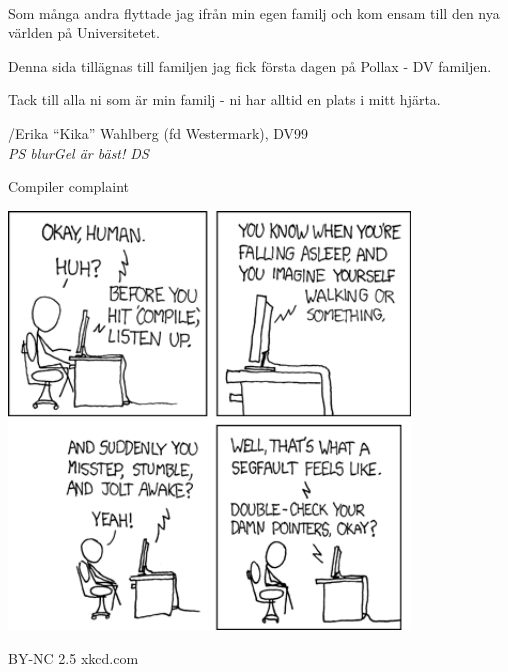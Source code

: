 \documentclass[a6paper,fontsize=10pt,twoside,open=right]{scrbook}
\begin{document}
\vspace{10pt}\\ Som många andra flyttade jag ifrån min egen familj och
kom ensam till den nya världen på Universitetet.\par
\vspace{10pt}
Denna sida tillägnas till familjen jag fick första dagen på Pollax -
DV familjen.\par
\vspace{10pt}
Tack till alla ni som är min familj - ni har alltid en plats i mitt
hjärta.\par
\vspace{10pt}
/Erika ``Kika'' Wahlberg (fd Westermark),
DV99\\{\footnotesize\textit{PS blurGel är bäst! DS}}
\newpage

\vspace{15pt}

\newpage

\newpage

\newpage

\vspace{15pt}

\newpage

\vspace{15pt}

\newpage
\null
\vfill
{}
\begin{center}
  \tiny{Compiler complaint}\par
  \vspace{5pt}
  \includegraphics[keepaspectratio,width=0.8\textwidth]{elements/images/compiler_complaint_1.png}\par
  \vspace{5pt}
  \tiny{BY-NC 2.5 xkcd.com}
\end{center}
\end{document}
